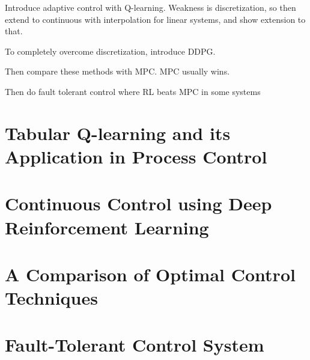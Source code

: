 %
% 

Introduce adaptive control with Q-learning.  Weakness is discretization, so then extend to continuous with interpolation for linear systems, and show extension to that.

To completely overcome discretization, introduce DDPG.

Then compare these methods with MPC. MPC usually wins.

Then do fault tolerant control where RL beats MPC in some systems

\section{Tabular Q-learning and its Application in Process Control}

\section{Continuous Control using Deep Reinforcement Learning}

\section{A Comparison of Optimal Control Techniques}

\section{Fault-Tolerant Control System}
